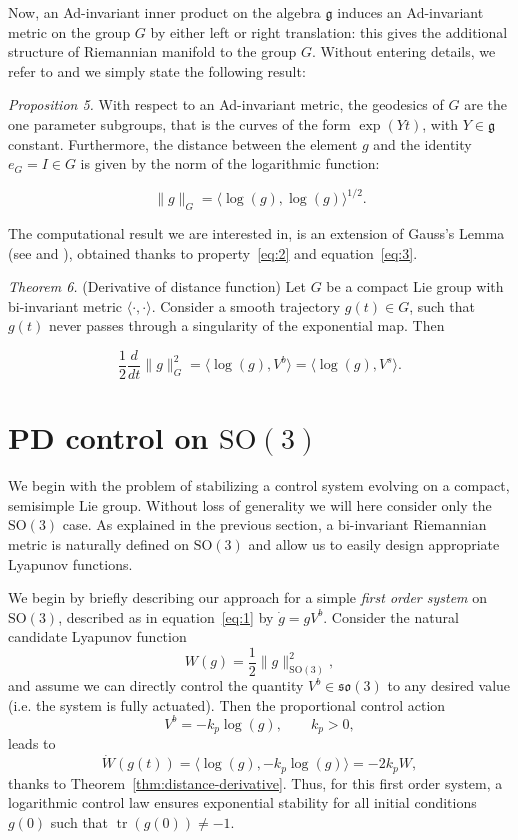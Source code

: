 \documentclass[10pt,twocolumn]{article}
\newcommand{\SO}{\mathrm{SO}}
\newcommand{\so}{\mathfrak{so}}
\newcommand{\gfrak}{\mathfrak g}
\newcommand{\tr}{\operatorname{tr}}
\newcounter{paperitem}
\newcommand{\paperhead}[3]{\refstepcounter{paperitem}\par\medskip\noindent\textit{#1}\label{#3} #2\par}
\begin{document}
Now, an Ad-invariant inner product on the algebra $\gfrak$ induces an Ad-invariant metric on the group $G$ by either left or right translation: this gives the additional structure of Riemannian manifold to the group $G$. Without entering details, we refer to \cite{9} and we simply state the following result:

\paperhead{Proposition 5.}{With respect to an Ad-invariant metric, the geodesics of $G$ are the one parameter subgroups, that is the curves of the form $\exp(Yt)$, with $Y\in\gfrak$ constant. Furthermore, the distance between the element $g$ and the identity $e_G=I\in G$ is given by the norm of the logarithmic function:}{prop:geodesics}
\begin{equation*}
\|g\|_G=\langle\log(g),\log(g)\rangle^{1/2}.\tag{3}\label{eq:3}
\end{equation*}

The computational result we are interested in, is an extension of Gauss's Lemma (see \cite{9} and \cite{10}), obtained thanks to property~\eqref{eq:2} and equation~\eqref{eq:3}.

\paperhead{Theorem 6.}{(Derivative of distance function) Let $G$ be a compact Lie group with bi-invariant metric $\langle\cdot,\cdot\rangle$. Consider a smooth trajectory $g(t)\in G$, such that $g(t)$ never passes through a singularity of the exponential map. Then}{thm:distance-derivative}
\begin{equation*}
\frac12\frac{d}{dt}\|g\|_G^2=\langle\log(g),V^b\rangle=\langle\log(g),V^s\rangle.
\end{equation*}

\section{PD control on $\SO(3)$}\label{sec:pd-so3}
We begin with the problem of stabilizing a control system evolving on a compact, semisimple Lie group. Without loss of generality we will here consider only the $\SO(3)$ case. As explained in the previous section, a bi-invariant Riemannian metric is naturally defined on $\SO(3)$ and allow us to easily design appropriate Lyapunov functions.

We begin by briefly describing our approach for a simple \emph{first order system} on $\SO(3)$, described as in equation~\eqref{eq:1} by $\dot g=gV^b$. Consider the natural candidate Lyapunov function
\begin{equation*}
W(g)=\frac12\|g\|_{\SO(3)}^2,
\end{equation*}
and assume we can directly control the quantity $V^b\in\so(3)$ to any desired value (i.e. the system is fully actuated). Then the proportional control action
\begin{equation*}
V^b=-k_p\log(g),\qquad k_p>0,\tag{4}\label{eq:4}
\end{equation*}
leads to
\begin{equation*}
\dot W(g(t))=\langle\log(g),-k_p\log(g)\rangle=-2k_pW,
\end{equation*}
thanks to Theorem~\ref{thm:distance-derivative}. Thus, for this first order system, a logarithmic control law ensures exponential stability for all initial conditions $g(0)$ such that $\tr(g(0))\neq-1$.
\end{document}
